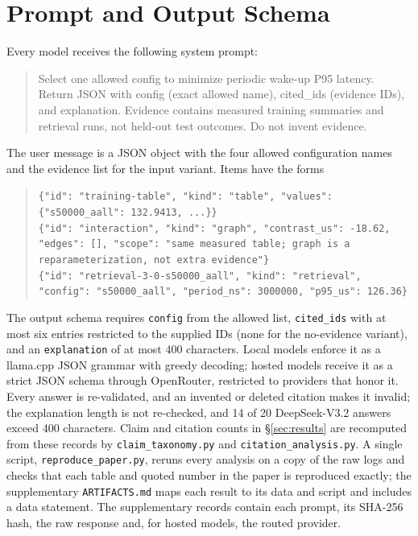 \section{Prompt and Output Schema}
\label{app:prompt}
Every model receives the following system prompt:
\begin{quote}\small
Select one allowed config to minimize periodic wake-up P95 latency. Return JSON with config (exact allowed name), cited\_ids (evidence IDs), and explanation. Evidence contains measured training summaries and retrieval runs, not held-out test outcomes. Do not invent evidence.
\end{quote}
The user message is a JSON object with the four allowed configuration names and the evidence list for the input variant. Items have the forms
\begin{quote}\small\raggedright
\texttt{\{"id": "training-table", "kind": "table", "values": \{"s50000\_aall": 132.9413, ...\}\}}\\
\texttt{\{"id": "interaction", "kind": "graph", "contrast\_us": -18.62, "edges": [], "scope": "same measured table; graph is a reparameterization, not extra evidence"\}}\\
\texttt{\{"id": "retrieval-3-0-s50000\_aall", "kind": "retrieval", "config": "s50000\_aall", "period\_ns": 3000000, "p95\_us": 126.36\}}
\end{quote}
The output schema requires \texttt{config} from the allowed list, \texttt{cited\_ids} with at most six entries restricted to the supplied IDs (none for the no-evidence variant), and an \texttt{explanation} of at most 400 characters. Local models enforce it as a llama.cpp JSON grammar with greedy decoding; hosted models receive it as a strict JSON schema through OpenRouter, restricted to providers that honor it. Every answer is re-validated, and an invented or deleted citation makes it invalid; the explanation length is not re-checked, and 14 of 20 DeepSeek-V3.2 answers exceed 400 characters. Claim and citation counts in \S\ref{sec:results} are recomputed from these records by \texttt{claim\_taxonomy.py} and \texttt{citation\_analysis.py}. A single script, \texttt{reproduce\_paper.py}, reruns every analysis on a copy of the raw logs and checks that each table and quoted number in the paper is reproduced exactly; the supplementary \texttt{ARTIFACTS.md} maps each result to its data and script and includes a data statement. The supplementary records contain each prompt, its SHA-256 hash, the raw response and, for hosted models, the routed provider.

